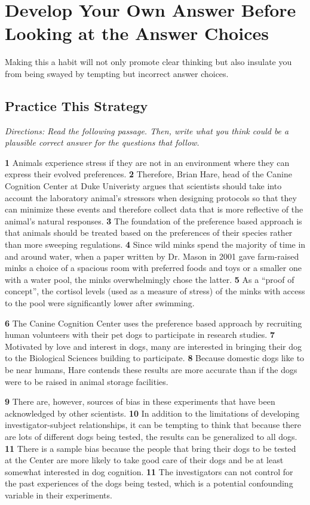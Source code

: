 \section{Develop Your Own Answer Before Looking at the Answer Choices}

Making this a habit will not only promote clear thinking but also insulate you from being swayed by tempting but incorrect answer choices.

\subsection{Practice This Strategy}

\textit{Directions: Read the following passage. Then, write what you think could be a plausible correct answer for the questions that follow.}

\bigskip

\indent \textbf{1} Animals experience stress if they are not in an environment where they can express their evolved preferences. \textbf{2} Therefore, Brian Hare, head of the Canine Cognition Center at Duke Univeristy argues that scientists should take into account the laboratory animal’s stressors when designing protocols so that they can minimize these events and therefore collect data that is more reflective of the animal’s natural responses. \textbf{3} The foundation of the preference based approach is that animals should be treated based on the preferences of their species rather than more sweeping regulations. \textbf{4} Since wild minks spend the majority of time in and around water, when a paper written by Dr. Mason in 2001 gave farm-raised minks a choice of a spacious room with preferred foods and toys or a smaller one with a water pool, the minks overwhelmingly chose the latter. \textbf{5} As a ``proof of concept'', the cortisol levels (used as a measure of stress) of the minks with access to the pool were significantly lower after swimming.

\indent \textbf{6} The Canine Cognition Center uses the preference based approach by recruiting human volunteers with their pet dogs to participate in research studies. \textbf{7} Motivated by love and interest in dogs, many are interested in bringing their dog to the Biological Sciences building to participate. \textbf{8} Because domestic dogs like to be near humans, Hare contends these results are more accurate than if the dogs were to be raised in animal storage facilities. 

\indent \textbf{9} There are, however, sources of bias in these experiments that have been acknowledged by other scientists. \textbf{10} In addition to the limitations of developing investigator-subject relationships, it can be tempting to think that because there are lots of different dogs being tested, the results can be generalized to all dogs. \textbf{11} There is a sample bias because the people that bring their dogs to be tested at the Center are more likely to take good care of their dogs and be at least somewhat interested in dog cognition. \textbf{11} The investigators can not control for the past experiences of the dogs being tested, which is a potential confounding variable in their experiments. 


